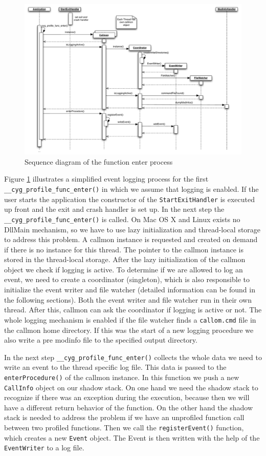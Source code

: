 \begin{figure}[ht]
\centering
\includegraphics[width=16cm]{images/callmon_sequence_diagram}
\caption{Sequence diagram of the function enter process}\label{fig:UNIXfe_figure2}
\end{figure}

Figure \ref{fig:UNIXfe_figure2} illustrates a simplified event logging process for the first \verb=__cyg_profile_func_enter()= in which we assume that logging is enabled. If the user starts the application the constructor of the \verb=StartExitHandler= is executed up front and the exit and crash handler is set up. In the next step the \verb=__cyg_profile_func_enter()= is called. On Mac OS X and Linux exists no DllMain mechanism, so we have to use lazy initialization and thread-local storage to address this problem. A callmon instance is requested and created on demand if there is no instance for this thread. The pointer to the callmon instance is stored in the thread-local storage. After the lazy	initialization of the callmon object we check if logging is active. To determine if we are allowed to log an event, we need to create a coordinator (singleton), which is also responsible to initialize the event writer and file watcher (detailed information can be found in the following sections). Both the event writer and file watcher run in their own thread. After this, callmon can ask the coordinator if logging is active or not. The whole logging mechanism is enabled if the file watcher finds a \verb=callom.cmd= file in the callmon home directory. If this was the start of a new logging procedure we also write a pre modinfo file to the specified output directory.

In the next step \verb=__cyg_profile_func_enter()= collects the whole data we need to write an event to the thread specific log file. This data is passed to the \verb=enterProcedure()= of the callmon instance. In this function we push a new \verb=CallInfo= object on our shadow stack. On one hand we need the shadow stack to recognize if there was an exception during the execution, because then we will have a different return behavior of the function. On the other hand the shadow stack is needed to address the problem if we have an unprofiled function call between two profiled functions. Then we call the \verb=registerEvent()= function, which creates a new \verb=Event= object. The Event is then written with the help of the \verb=EventWriter= to a log file.

